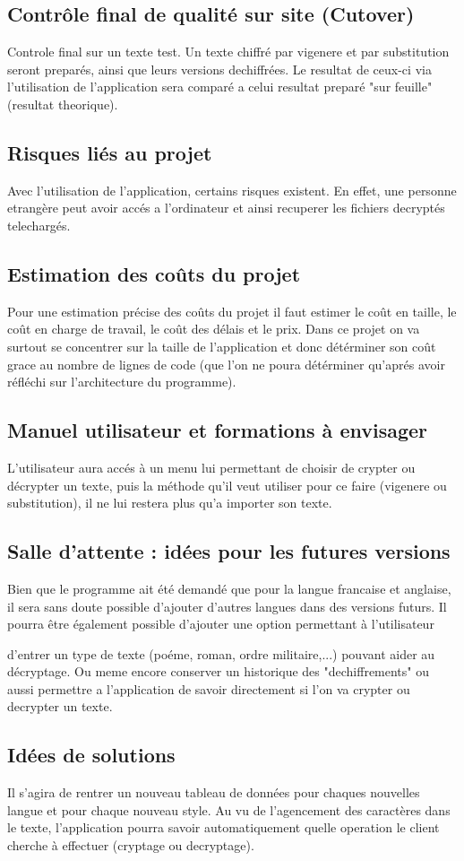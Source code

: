 \documentclass[a4]{article}
\begin{document}
		
		
		\subsection{Contrôle final de qualité sur site (Cutover)}
		Controle final sur un texte test. Un texte chiffré par vigenere et par substitution seront preparés, ainsi que 			leurs versions dechiffrées. Le resultat de ceux-ci via l'utilisation de l'application sera comparé a celui resultat 				preparé "sur feuille"(resultat theorique). 
		\subsection{Risques liés au projet}
		Avec l'utilisation de l'application, certains risques existent. En effet, une personne etrangère peut avoir 			accés a l'ordinateur et ainsi recuperer les fichiers decryptés telechargés.
		\subsection{Estimation des coûts du projet}
		 	Pour une estimation précise des coûts du projet il faut estimer le coût en taille, 
			le coût en charge de travail, le coût des délais et le prix. Dans ce projet on va surtout 
			se concentrer sur la taille de l'application et donc détérminer son coût grace au nombre de 
			lignes de code (que l'on ne poura détérminer qu'aprés avoir réfléchi sur l'architecture du 				programme).		  		
		\subsection{Manuel utilisateur et formations à envisager}
			L'utilisateur aura accés à un menu lui permettant de choisir de crypter ou décrypter un texte,
			puis la méthode qu'il veut utiliser pour ce faire (vigenere ou substitution), il ne lui restera 
			plus qu'a importer son texte.
		\subsection{Salle d’attente : idées pour les futures versions}
			Bien que le programme ait été demandé que pour la langue francaise et anglaise, 
			il sera sans doute possible d'ajouter d'autres langues dans des versions futurs. 
			Il pourra être également possible d'ajouter une option permettant à l'utilisateur

			d'entrer un type de texte (poéme, roman, ordre militaire,...) pouvant aider au décryptage. Ou meme 				encore conserver un historique des "dechiffrements" ou aussi permettre a l'application de savoir 			directement si l'on va crypter ou decrypter un texte.

		\subsection{Idées de solutions}
		 	Il s'agira de rentrer un nouveau tableau de données pour chaques nouvelles langue et pour 
			chaque nouveau style.
			Au vu de l'agencement des caractères dans le texte, l'application pourra savoir automatiquement quelle 				operation le client cherche à effectuer (cryptage ou decryptage).
\end{document}
